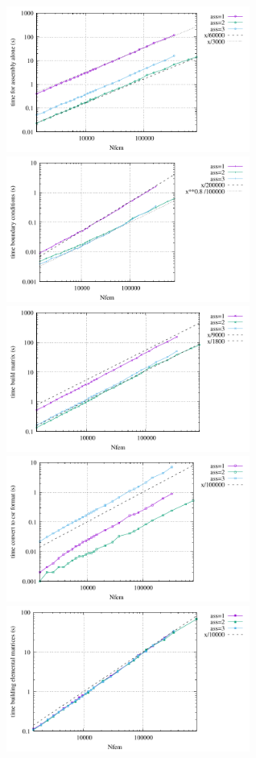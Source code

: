 \begin{center}
\includegraphics[width=8cm]{python_codes/fieldstone_181/RESULTS/times_assembly.pdf}
\includegraphics[width=8cm]{python_codes/fieldstone_181/RESULTS/times_bc.pdf}\\
\includegraphics[width=8cm]{python_codes/fieldstone_181/RESULTS/times_build.pdf}
\includegraphics[width=8cm]{python_codes/fieldstone_181/RESULTS/times_convert.pdf}\\
\includegraphics[width=8cm]{python_codes/fieldstone_181/RESULTS/times_matrices.pdf}

\end{center}
